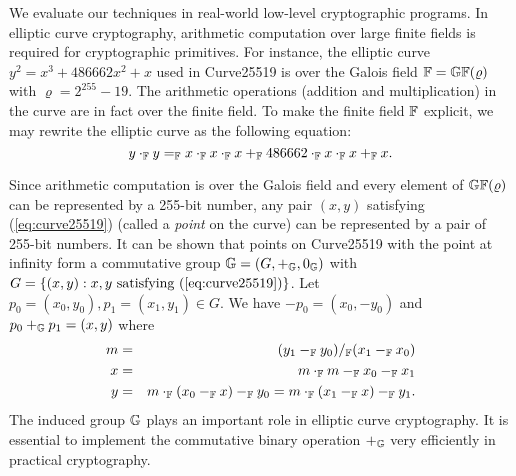 
We evaluate our techniques in real-world low-level cryptographic
programs. In elliptic curve cryptography, arithmetic computation over
large finite fields is required for cryptographic primitives. For
instance, the elliptic curve $y^2 = x^3 + 486662 x^2 + x$ used in 
Curve25519 is over the Galois field $\mathbb{F} = \mathbb{GF}(\varrho)$ with
$\varrho = 2^{255} - 19$. The arithmetic operations (addition and
multiplication) in the curve are in fact over the finite field. To
make the finite field $\mathbb{F}$ explicit, we may rewrite the elliptic
curve as the following equation: 
\begin{equation}
  \label{eq:curve25519}
  y \cdot_{\mathbb{F}} y =_{\mathbb{F}} x \cdot_{\mathbb{F}} x \cdot_{\mathbb{F}} x +_{\mathbb{F}}
  486662 \cdot_{\mathbb{F}} x \cdot_{\mathbb{F}} x +_{\mathbb{F}} x.
\end{equation}

Since arithmetic computation is over the Galois field and every
element of $\mathbb{GF}(\varrho)$ can be represented by a 255-bit number,
any pair $(x, y)$ satisfying (\ref{eq:curve25519}) (called a
\emph{point} on the curve) can be represented by a pair of 255-bit
numbers. It can be shown that points on Curve25519 with the point at
infinity form a commutative group $\mathbb{G} = (G, +_{\mathbb{G}}, 0_{\mathbb{G}})$
with $G = \{ (x, y) : x, y \textmd{ satisfying } (\ref{eq:curve25519})
\}$. Let $p_0 = (x_0, y_0), p_1 = (x_1, y_1) \in G$. We have $-p_0 =
(x_0, -y_0)$ and $p_0 +_{\mathbb{G}} p_1 = (x, y)$ where
\begin{eqnarray*}
  m & = & (y_1 -_{\mathbb{F}} y_0) /_{\mathbb{F}} (x_1 -_{\mathbb{F}} x_0)\\
  x & = & m \cdot_{\mathbb{F}} m -_{\mathbb{F}} x_0 -_{\mathbb{F}} x_1\\
  y & = & m \cdot_{\mathbb{F}} (x_0 -_{\mathbb{F}} x) -_{\mathbb{F}} y_0
     = m \cdot_{\mathbb{F}} (x_1 -_{\mathbb{F}} x) -_{\mathbb{F}} y_1.
\end{eqnarray*}
The induced group $\mathbb{G}$ plays an important role in elliptic
curve cryptography. It is essential to implement the commutative binary
operation $+_{\mathbb{G}}$ very efficiently in practical cryptography. 